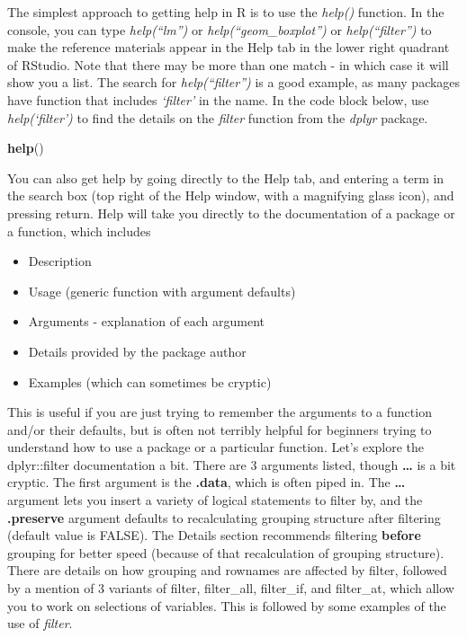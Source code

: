 \documentclass[
]{book}
\newenvironment{Shaded}{\begin{snugshade}}{\end{snugshade}}
\newcommand{\KeywordTok}[1]{\textcolor[rgb]{0.13,0.29,0.53}{\textbf{#1}}}
\newcommand{\NormalTok}[1]{#1}
\providecommand{\tightlist}{%
  \setlength{\itemsep}{0pt}\setlength{\parskip}{0pt}}
\begin{document}
The simplest approach to getting help in R is to use the \emph{help()} function. In the console, you can type \emph{help(``lm'')} or \emph{help(``geom\_boxplot'')} or \emph{help(``filter'')} to make the reference materials appear in the Help tab in the lower right quadrant of RStudio. Note that there may be more than one match - in which case it will show you a list. The search for \emph{help(``filter'')} is a good example, as many packages have function that includes \emph{`filter'} in the name.
In the code block below, use \emph{help(`filter')} to find the details on the \emph{filter} function from the \emph{dplyr} package.

\begin{Shaded}
\begin{Highlighting}[]
\KeywordTok{help}\NormalTok{()}
\end{Highlighting}
\end{Shaded}

You can also get help by going directly to the Help tab, and entering a term in the search box (top right of the Help window, with a magnifying glass icon), and pressing return.
Help will take you directly to the documentation of a package or a function, which includes

\begin{itemize}
\tightlist
\item
  Description
\item
  Usage (generic function with argument defaults)
\item
  Arguments - explanation of each argument
\item
  Details provided by the package author
\item
  Examples (which can sometimes be cryptic)
\end{itemize}

This is useful if you are just trying to remember the arguments to a function and/or their defaults, but is often not terribly helpful for beginners trying to understand how to use a package or a particular function.
Let's explore the dplyr::filter documentation a bit. There are 3 arguments listed, though \textbf{\ldots{}} is a bit cryptic. The first argument is the \textbf{.data}, which is often piped in. The
\textbf{\ldots{}} argument lets you insert a variety of logical statements to filter by, and the \textbf{.preserve} argument defaults to recalculating grouping structure after filtering (default value is FALSE).
The Details section recommends filtering \textbf{before} grouping for better speed (because of that recalculation of grouping structure).
There are details on how grouping and rownames are affected by filter, followed by a mention of 3 variants of filter, filter\_all, filter\_if, and filter\_at, which allow you to work on selections of variables.
This is followed by some examples of the use of \emph{filter}.
\end{document}
